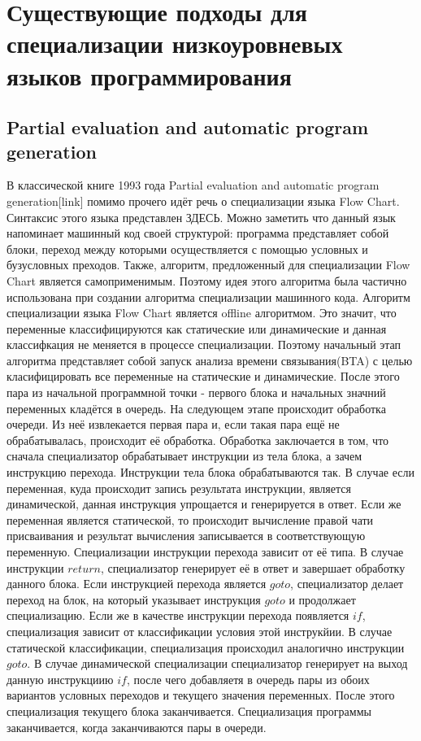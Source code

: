 \documentclass{spbau-diploma}
\begin{document}
\section{Существующие подходы для специализации низкоуровневых языков программирования}

\subsection{Partial evaluation and automatic program generation}
В классической книге 1993 года Partial evaluation and automatic program generation[link] помимо прочего идёт речь о специализации языка Flow Chart. Синтаксис этого языка представлен ЗДЕСЬ. Можно заметить что данный язык напоминает машинный код своей структурой: программа представляет собой блоки, переход между которыми осуществляется с помощью условных и бузусловных преходов. Также, алгоритм, предложенный для специализации Flow Chart является самоприменимым. Поэтому идея этого алгоритма была частично использована при создании алгоритма специализации машинного кода. Алгоритм специализации языка Flow Chart является offline алгоритмом. Это значит, что переменные классифицируются как статические или динамические и данная классифкация не меняется в процессе специализации. Поэтому начальный этап алгоритма представляет собой запуск анализа времени связывания(BTA) с целью класифицировать все переменные на статические и динамические. После этого пара из начальной программной точки - первого блока и начальных значний переменных кладётся в очередь. На следующем этапе происходит обработка очереди. Из неё извлекается первая пара и, если такая пара ещё не обрабатывалась, происходит её обработка. Обработка заключается в том, что сначала специализатор обрабатывает инструкции из тела блока, а зачем инструкцию перехода. Инструкции тела блока обрабатываются так. В случае если переменная, куда происходит запись результата инструкции, является динамической, данная инструкция упрощается и генерируется в ответ. Если же переменная является статической, то происходит вычисление правой чати присваивания и результат вычисления записывается в соответствующую переменную. Специализации инструкции перехода зависит от её типа. В случае инструкции $return$, специализатор генерирует её в ответ и завершает обработку данного блока. Если инструкцией перехода является $goto$, специализатор делает переход на блок, на который указывает инструкция $goto$ и продолжает специализацию. Если же в качестве инструкции перехода появляется $if$, специализация зависит от классификации условия этой инструкйии. В случае статической классификации, специализация происходил аналогично инструкции $goto$. В случае динамической специализации специализатор генерирует на выход данную инструкциию $if$, после чего добавляетя в очередь пары из обоих вариантов условных переходов и текущего значения переменных. После этого специализация текущего блока заканчивается. Специализация программы заканчивается, когда заканчиваются пары в очереди. 
\end{document}
